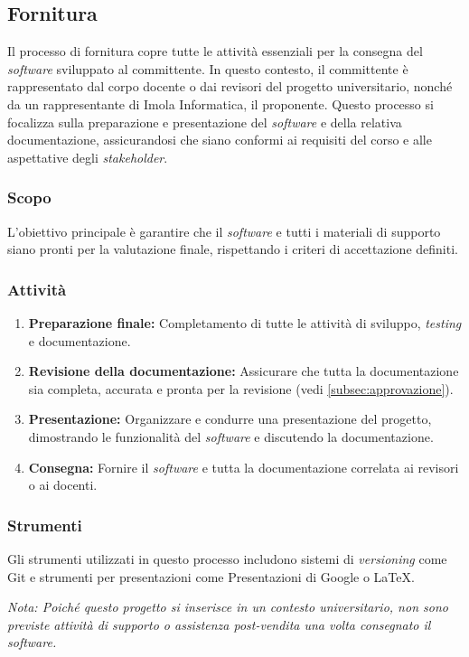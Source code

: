 \subsection{Fornitura}
Il processo di fornitura copre tutte le attività essenziali per la consegna del \textit{software} sviluppato al committente. 
In questo contesto, il committente è rappresentato dal corpo docente o dai revisori del progetto universitario, nonché da un rappresentante di Imola Informatica, il proponente. 
Questo processo si focalizza sulla preparazione e presentazione del \textit{software} e della relativa documentazione, assicurandosi che siano conformi ai requisiti del corso e alle aspettative degli \textit{stakeholder}.

\subsubsection{Scopo}
L'obiettivo principale è garantire che il \textit{software} e tutti i materiali
di supporto siano pronti per la valutazione finale, rispettando i criteri di
accettazione definiti.

\subsubsection{Attività}
\begin{enumerate}
	\item \textbf{Preparazione finale:} Completamento di tutte le attività di
	      sviluppo, \textit{testing} e documentazione.
	\item \textbf{Revisione della documentazione:} Assicurare che tutta la
	      documentazione sia completa, accurata e pronta per la revisione
	      (vedi \cref{subsec:approvazione}).
	\item \textbf{Presentazione:} Organizzare e condurre una presentazione del
	      progetto, dimostrando le funzionalità del \textit{software} e
	      discutendo la documentazione.
	\item \textbf{Consegna:} Fornire il \textit{software} e tutta la
	      documentazione correlata ai revisori o ai docenti.
\end{enumerate}

\subsubsection{Strumenti}
Gli strumenti utilizzati in questo processo includono sistemi di
\textit{versioning} come Git e strumenti per presentazioni come Presentazioni di Google o LaTeX.

\textit{Nota: Poiché questo progetto si inserisce in un contesto universitario,
	non sono previste attività di supporto o assistenza post-vendita una volta
	consegnato il \textit{software}.}
